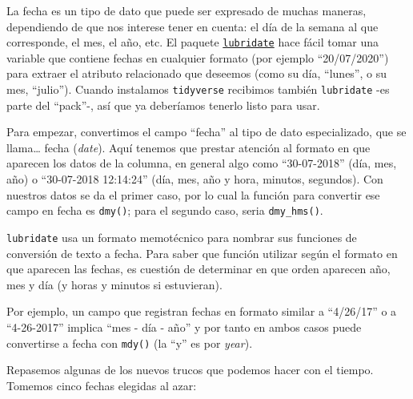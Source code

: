 \documentclass[
]{book}
\newenvironment{Shaded}{\begin{snugshade}}{\end{snugshade}}
\newcommand{\DecValTok}[1]{\textcolor[rgb]{0.00,0.00,0.81}{#1}}
\newcommand{\FunctionTok}[1]{\textcolor[rgb]{0.00,0.00,0.00}{#1}}
\newcommand{\NormalTok}[1]{#1}
\newcommand{\OtherTok}[1]{\textcolor[rgb]{0.56,0.35,0.01}{#1}}
\newcommand{\SpecialCharTok}[1]{\textcolor[rgb]{0.00,0.00,0.00}{#1}}
\begin{document}
La fecha es un tipo de dato que puede ser expresado de muchas maneras, dependiendo de que nos interese tener en cuenta: el día de la semana al que corresponde, el mes, el año, etc. El paquete \href{https://lubridate.tidyverse.org/}{\texttt{lubridate}} hace fácil tomar una variable que contiene fechas en cualquier formato (por ejemplo ``20/07/2020'') para extraer el atributo relacionado que deseemos (como su día, ``lunes'', o su mes, ``julio''). Cuando instalamos \texttt{tidyverse} recibimos también \texttt{lubridate} -es parte del ``pack''-, así que ya deberíamos tenerlo listo para usar.

Para empezar, convertimos el campo ``fecha'' al tipo de dato especializado, que se llama\ldots{} fecha (\emph{date}). Aquí tenemos que prestar atención al formato en que aparecen los datos de la columna, en general algo como ``30-07-2018'' (día, mes, año) o ``30-07-2018 12:14:24'' (día, mes, año y hora, minutos, segundos). Con nuestros datos se da el primer caso, por lo cual la función para convertir ese campo en fecha es \texttt{dmy()}; para el segundo caso, seria \texttt{dmy\_hms()}.

\begin{Shaded}
\end{Shaded}

\texttt{lubridate} usa un formato memotécnico para nombrar sus funciones de conversión de texto a fecha.
Para saber que función utilizar según el formato en que aparecen las fechas, es cuestión de determinar en que orden aparecen año, mes y día (y horas y minutos si estuvieran).

Por ejemplo, un campo que registran fechas en formato similar a ``4/26/17'' o a ``4-26-2017'' implica ``mes - día - año'' y por tanto en ambos casos puede convertirse a fecha con \texttt{mdy()} (la ``y'' es por \emph{year}).

Repasemos algunas de los nuevos trucos que podemos hacer con el tiempo. Tomemos cinco fechas elegidas al azar:

\begin{Shaded}
\end{Shaded}
\end{document}

